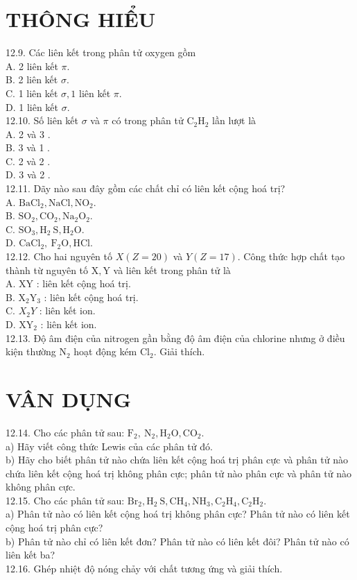 \documentclass[10pt]{article}
\begin{document}
\section*{THÔNG HIỂU}
12.9. Các liên kết trong phân tử oxygen gồm\\
A. 2 liên kết $\pi$.\\
B. 2 liên kết $\sigma$.\\
C. 1 liên kết $\sigma, 1$ liên kết $\pi$.\\
D. 1 liên kết $\sigma$.\\
12.10. Số liên kết $\sigma$ và $\pi$ có trong phân tử $\mathrm{C}_{2} \mathrm{H}_{2}$ lần lượt là\\
A. 2 và 3 .\\
B. 3 và 1 .\\
C. 2 và 2 .\\
D. 3 và 2 .\\
12.11. Dãy nào sau đây gồm các chất chỉ có liên kết cộng hoá trị?\\
A. $\mathrm{BaCl}_{2}, \mathrm{NaCl}, \mathrm{NO}_{2}$.\\
B. $\mathrm{SO}_{2}, \mathrm{CO}_{2}, \mathrm{Na}_{2} \mathrm{O}_{2}$.\\
C. $\mathrm{SO}_{3}, \mathrm{H}_{2} \mathrm{~S}, \mathrm{H}_{2} \mathrm{O}$.\\
D. $\mathrm{CaCl}_{2}, \mathrm{~F}_{2} \mathrm{O}, \mathrm{HCl}$.\\
12.12. Cho hai nguyên tố $X(Z=20)$ và $Y(Z=17)$. Công thức hợp chất tạo thành từ nguyên tố $\mathrm{X}, \mathrm{Y}$ và liên kết trong phân tử là\\
A. XY : liên kết cộng hoá trị.\\
B. $\mathrm{X}_{2} \mathrm{Y}_{3}$ : liên kết cộng hoá trị.\\
C. $X_{2} Y$ : liên kết ion.\\
D. $\mathrm{XY}_{2}$ : liên kết ion.\\
12.13. Độ âm điện của nitrogen gần bằng độ âm điện của chlorine nhưng ở điều kiện thường $\mathrm{N}_{2}$ hoạt động kém $\mathrm{Cl}_{2}$. Giải thích.

\section*{VÂN DỤNG}
12.14. Cho các phân tử sau: $\mathrm{F}_{2}, \mathrm{~N}_{2}, \mathrm{H}_{2} \mathrm{O}, \mathrm{CO}_{2}$.\\
a) Hãy viết công thức Lewis của các phân tử đó.\\
b) Hãy cho biết phân tử nào chứa liên kết cộng hoá trị phân cực và phân tử nào chứa liên kết cộng hoá trị không phân cực; phân tử nào phân cực và phân tử nào không phân cực.\\
12.15. Cho các phân tử sau: $\mathrm{Br}_{2}, \mathrm{H}_{2} \mathrm{~S}, \mathrm{CH}_{4}, \mathrm{NH}_{3}, \mathrm{C}_{2} \mathrm{H}_{4}, \mathrm{C}_{2} \mathrm{H}_{2}$.\\
a) Phân tử nào có liên kết cộng hoá trị không phân cực? Phân tử nào có liên kết cộng hoá trị phân cực?\\
b) Phân tử nào chỉ có liên kết đơn? Phân tử nào có liên kết đôi? Phân tử nào có liên kết ba?\\
12.16. Ghép nhiệt độ nóng chảy với chất tương ứng và giải thích.
\end{document}
